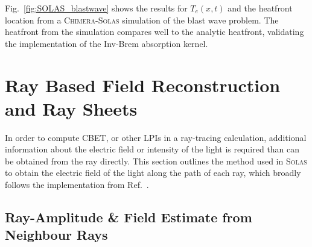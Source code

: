 Fig.~\ref{fig:SOLAS_blastwave} shows the results for $T_e(x,t)$ and the heatfront location from a \textsc{Chimera}-\textsc{Solas} simulation of the blast wave problem.
The heatfront from the simulation compares well to the analytic heatfront, validating the implementation of the \ac{Inv-Brem} absorption kernel.


\section{Ray Based Field Reconstruction and Ray Sheets}%
\label{sec:SOLAS_field_reconstruc}

In order to compute \ac{CBET}, or other \ac{LPIs} in a ray-tracing calculation, additional information about the electric field or intensity of the light is required than can be obtained from the ray directly.
This section outlines the method used in \textsc{Solas} to obtain the electric field of the light along the path of each ray, which broadly follows the implementation from Ref.~\cite{follett_validation_2022}.

\subsection{Ray-Amplitude \& Field Estimate from Neighbour Rays}%
\label{sec:SOLAS_ray_amplitude}

